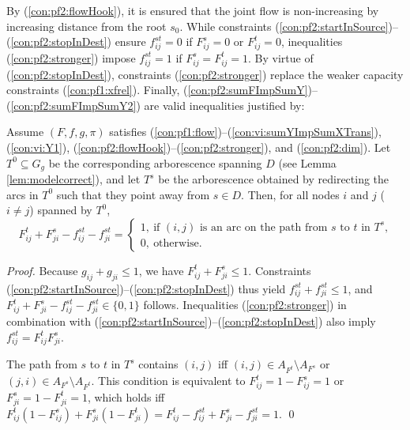 By (\ref{con:pf2:flowHook}), it is ensured that the joint flow is non-increasing by increasing distance from the root $s_0$.
While constraints (\ref{con:pf2:startInSource})--(\ref{con:pf2:stopInDest}) ensure $f_{ij}^{st}=0$ if $F_{ij}^s=0$ or $F_{ij}^t=0$,
inequalities (\ref{con:pf2:stronger}) impose $f_{ij}^{st}=1$ if $F_{ij}^s=F_{ij}^t=1$.
By virtue of (\ref{con:pf2:stopInDest}), constraints (\ref{con:pf2:stronger}) replace the weaker capacity constraints (\ref{con:pf1:xfrel}).
Finally, (\ref{con:pf2:sumFImpSumY})--(\ref{con:pf2:sumFImpSumY2}) are valid inequalities justified by:
\begin{prop}\label{prop:transX}
Assume $(F,f,g,\pi)$ satisfies (\ref{con:pf1:flow})--(\ref{con:vi:sumYImpSumXTrans}), (\ref{con:vi:Y1}), (\ref{con:pf2:flowHook})--(\ref{con:pf2:stronger}), and (\ref{con:pf2:dim}).
Let $T^0\subseteq G_g$ be the corresponding arborescence spanning $D$ (see Lemma \ref{lem:modelcorrect}),
and let $T^s$ be the arborescence obtained by redirecting the arcs in $T^0$ such that they point away from $s\in D$. 
Then, for all nodes $i$ and $j$ ($i\neq j$) spanned by $T^0$,
$$
F^t_{ij}+F^s_{ji}-f^{st}_{ij}-f^{st}_{ji} = 
	\begin{cases}
		1, ~\text{if $(i,j)$ is an arc on the path from~$s$ to $t$ in $T^s$,} \\
		0, ~\text{otherwise.}
	\end{cases}
$$
\end{prop}
%
\begin{proof}
Because $g_{ij}+g_{ji}\leq 1$, we have $F^t_{ij}+F^s_{ji}\leq 1$.
Constraints (\ref{con:pf2:startInSource})--(\ref{con:pf2:stopInDest}) thus yield $f^{st}_{ij}+f^{st}_{ji}\leq 1$, and
$F^t_{ij}+F^s_{ji}-f^{st}_{ij}-f^{st}_{ji}\in \{0,1\}$ follows.
Inequalities (\ref{con:pf2:stronger}) in combination with (\ref{con:pf2:startInSource})--(\ref{con:pf2:stopInDest}) also imply $f^{st}_{ij}=F^t_{ij}F^s_{ji}$.

The path from $s$ to $t$ in $T^s$ contains $(i,j)$ iff $(i,j)\in A_{F^t}\setminus A_{F^s}$ or $(j,i)\in A_{F^s}\setminus A_{F^t}$.
This condition is equivalent to $F_{ij}^t=1-F_{ij}^s=1$ or $F_{ji}^s=1-F_{ji}^t=1$,
which holds iff $F_{ij}^t(1-F_{ij}^s)+F_{ji}^s(1-F_{ji}^t)=F_{ij}^t-f_{ij}^{st}+F_{ji}^s-f_{ji}^{st}=1$.
\qed
\end{proof}

